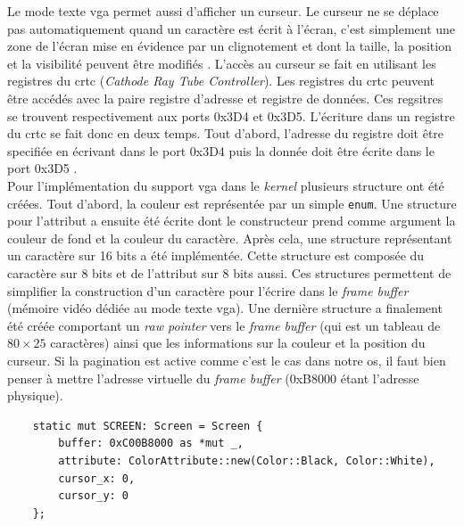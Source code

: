 Le mode texte \acrshort{vga} permet aussi d'afficher un curseur. Le curseur ne
se déplace pas automatiquement quand un caractère est écrit à l'écran, c'est
simplement une zone de l'écran mise en évidence par un clignotement et dont
la taille, la position et la visibilité peuvent être modifiés \cite{ref23}. L'accès
au curseur se fait en utilisant les registres du \acrshort{crtc} (\textit{Cathode Ray
Tube Controller}). Les registres du \acrshort{crtc} peuvent être accédés avec la
paire registre d'adresse et registre de données. Ces regsitres se trouvent respectivement
aux ports 0x3D4 et 0x3D5. L'écriture dans un registre du \acrshort{crtc} se fait
donc en deux temps. Tout d'abord, l'adresse du registre doit être specifiée
en écrivant dans le port 0x3D4 puis la donnée doit être écrite dans le port 0x3D5
\cite{ref42}. \\

Pour l'implémentation du support \acrshort{vga} dans le \textit{kernel} plusieurs
structure ont été créées. Tout d'abord, la couleur est représentée par un simple
\texttt{enum}. Une structure pour l'attribut a ensuite été écrite
dont le constructeur prend comme argument la couleur de fond et la couleur du
caractère. Après cela, une structure représentant un caractère sur 16 bits a été
implémentée. Cette structure est composée du caractère sur 8 bits et de l'attribut
sur 8 bits aussi. Ces structures permettent de simplifier la construction d'un
caractère pour l'écrire dans le \textit{frame buffer} (mémoire vidéo dédiée au
mode texte \acrshort{vga}). Une dernière structure a finalement été créée
comportant un \textit{raw pointer} vers le \textit{frame buffer} (qui est un
tableau de $80 \times 25$ caractères) ainsi que les informations sur la couleur
et la position du curseur. Si la pagination est active comme c'est le cas dans
notre \acrshort{os}, il faut bien penser à mettre l'adresse virtuelle du
\textit{frame buffer} (0xB8000 étant l'adresse physique). \\

\begin{verbatim}
    static mut SCREEN: Screen = Screen {
        buffer: 0xC00B8000 as *mut _,
        attribute: ColorAttribute::new(Color::Black, Color::White),
        cursor_x: 0,
        cursor_y: 0
    };
\end{verbatim}

